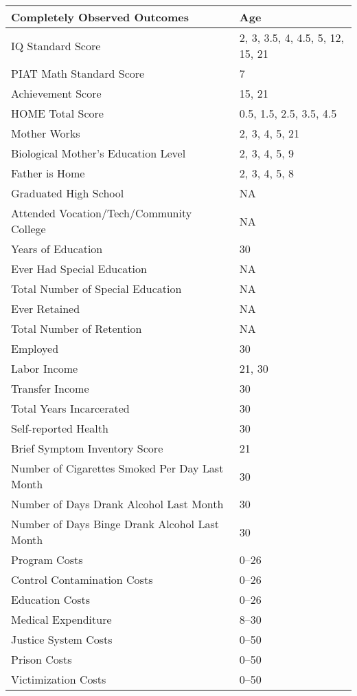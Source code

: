 \begin{tabular}{l l}
\toprule
Completely Observed Outcomes	&	Age	\\
\midrule			
IQ Standard Score	&			2, 3, 3.5, 4, 4.5, 5, 12, 15, 21	\\
PIAT Math Standard Score	&	7	\\
Achievement Score & 			15, 21 \\
HOME Total Score	&			0.5, 1.5, 2.5, 3.5, 4.5	\\
Mother Works	&				2, 3, 4, 5, 21	\\
Biological Mother's Education Level	&	2, 3, 4, 5, 9	\\
Father is Home	&				2, 3, 4, 5, 8	\\
Graduated High School	&		NA	\\
Attended Vocation/Tech/Community College	&	NA	\\
Years of Education	&	30	\\
Ever Had Special Education 			& NA \\
Total Number of Special Education 	& NA \\
Ever Retained						& NA \\
Total Number of Retention			& NA \\
Employed	&	30	\\
Labor Income &  21, 30 \\
Transfer Income &  30 \\
Total Years Incarcerated	&	30	\\
Self-reported Health	&	30	\\
Brief Symptom Inventory Score & 21 \\
Number of Cigarettes Smoked Per Day Last Month	&	30	\\
Number of Days Drank Alcohol Last Month	&	30	\\
Number of Days Binge Drank Alcohol Last Month	&	30	\\
Program Costs	&	0--26	\\
Control Contamination Costs	&	0--26	\\
Education Costs	&	0--26	\\
Medical Expenditure &	8--30	\\
Justice System Costs	&	0--50	\\
Prison Costs	&	0--50	\\
Victimization Costs	&	0--50	\\
\bottomrule			
\end{tabular}